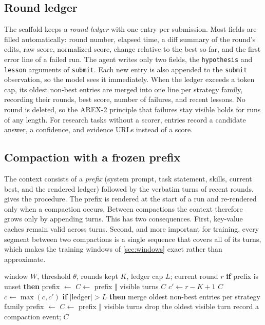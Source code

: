 \documentclass[11pt]{article}
\newcommand{\code}[1]{\texttt{#1}}
\begin{document}
\subsection{Round ledger}
The scaffold keeps a \emph{round ledger} with one entry per submission. Most fields are filled automatically: round number, elapsed time, a diff summary of the round's edits, raw score, normalized score, change relative to the best so far, and the first error line of a failed run. The agent writes only two fields, the \code{hypothesis} and \code{lesson} arguments of \code{submit}. Each new entry is also appended to the \code{submit} observation, so the model sees it immediately. When the ledger exceeds a token cap, its oldest non-best entries are merged into one line per strategy family, recording their rounds, best score, number of failures, and recent lessons. No round is deleted, so the AREX-2 principle that failures stay visible holds for runs of any length. For research tasks without a scorer, entries record a candidate answer, a confidence, and evidence URLs instead of a score.

\subsection{Compaction with a frozen prefix}
The context consists of a \emph{prefix} (system prompt, task statement, skills, current best, and the rendered ledger) followed by the verbatim turns of recent rounds.  gives the procedure. The prefix is rendered at the start of a run and re-rendered only when a compaction occurs. Between compactions the context therefore grows only by appending turns. This has two consequences. First, key-value caches remain valid across turns. Second, and more important for training, every segment between two compactions is a single sequence that covers all of its turns, which makes the training windows of \cref{sec:windows} exact rather than approximate.

\begin{algorithm}[t]
\caption{Round Ledger Compaction: building the context for the next turn}
\label{alg:rlc}
\begin{algorithmic}[1]
\Require window $W$, threshold $\theta$, rounds kept $K$, ledger cap $L$; current round $r$
\State \textbf{if} prefix is unset \textbf{then} prefix $\gets$ 
\State $C \gets$ prefix $\Vert$ visible turns
 \Return $C$ 
\EndIf
\State $c' \gets r - K + 1$
 \Return $C$ 
\EndIf
\State $c \gets \max(c, c')$ 
\State \textbf{if} $|\text{ledger}| > L$ \textbf{then} merge oldest non-best entries per strategy family
\State prefix $\gets$  
\State $C \gets$ prefix $\Vert$ visible turns
 drop the oldest visible turn
\EndWhile
\State record a compaction event; \Return $C$
\end{algorithmic}
\end{algorithm}
\end{document}
